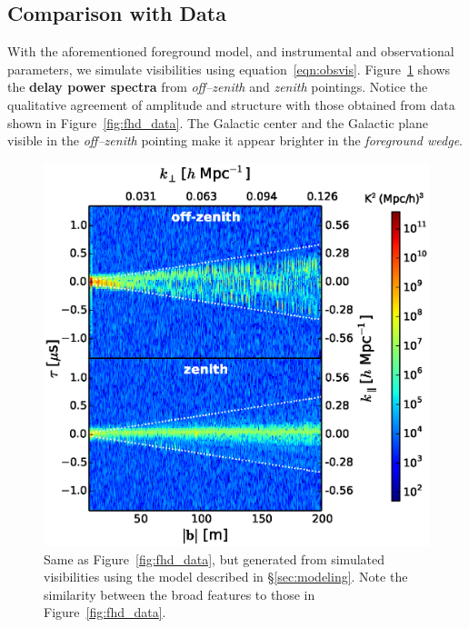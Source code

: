 \documentclass[preprint2,iop,numberedappendix]{emulateapj}
\begin{document}
\subsection{Comparison with Data}\label{sec:data-vs-model}

With the aforementioned foreground model, and instrumental and observational parameters, we simulate visibilities using equation~\ref{eqn:obsvis}. Figure~\ref{fig:sim_data} shows the {\bf delay power spectra} from {\it off--zenith} and {\it zenith} pointings. Notice the qualitative agreement of amplitude and structure with those obtained from data shown in Figure~\ref{fig:fhd_data}. The Galactic center and the Galactic plane visible in the {\it off--zenith} pointing make it appear brighter in the {\it foreground wedge}. 

\begin{figure}[htb]
\centering
\includegraphics[width=\linewidth]{fig7.eps}
\caption{Same as Figure~\ref{fig:fhd_data}, but generated from simulated visibilities using the model described in \S\ref{sec:modeling}. Note the similarity between the broad features to those in Figure~\ref{fig:fhd_data}. \label{fig:sim_data}}
\end{figure}
\end{document}
